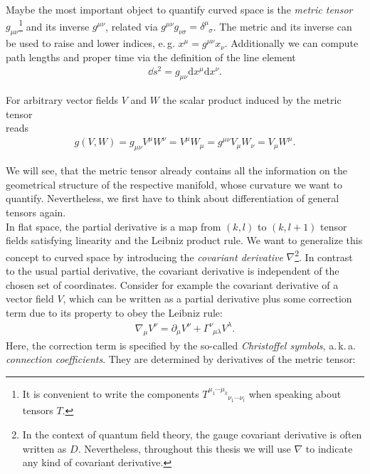 Maybe the most important object to quantify curved space is the \textit{metric tensor} $g_{\mu\nu}$\footnote{It is convenient to write the components $T_{\phantom{\mu_{1} \cdots \mu_{k}}\nu_{1} \cdots \nu_{l}}^{\mu_{1} \cdots \mu_{k}}$ when speaking about tensors $T$.} and its inverse  $g^{\mu\nu}$, related via $g^{\mu\nu}g_{\nu\sigma} = \delta^{\mu}_{\phantom{\mu}\sigma}$. The metric and its inverse can be used to raise and lower indices, e.\,g. $x^{\mu} = g^{\mu\nu}x_{\nu}$. Additionally we can compute path lengths and proper time via the definition of the line element 
\begin{align}
	\dd s^{2}=g_{\mu \nu} \mathrm{d} x^{\mu} \mathrm{d} x^{\nu}.
\end{align}
\begin{minipage}{\textwidth}
	For arbitrary vector fields $V$ and $W$ the scalar product induced by the metric tensor \\ reads
\vspace{-0.4cm}
\begin{align}
	g(V,W) = g_{\mu\nu}V^{\mu}W^{\nu} = V^{\mu}W_{\mu}= g^{\mu\nu}V_{\mu}W_{\nu} = V_{\mu}W^{\mu}.
\end{align}
\end{minipage}\vfill\newpage
We will see, that the metric tensor already contains all the information on the geometrical structure of the respective manifold, whose curvature we want to quantify. Nevertheless, we first have to think about differentiation of general tensors again. \\
In flat space, the partial derivative is a map from $(k, l)$ to $(k, l+1)$ tensor fields satisfying linearity and the Leibniz product rule. We want to generalize this concept to curved space by introducing the \textit{covariant derivative} $\nabla$\footnote{In the context of quantum field theory, the gauge covariant derivative is often written as $D$. Nevertheless, throughout this thesis we will use $\nabla$ to indicate any kind of covariant derivative.}. In contrast to the usual partial derivative, the covariant derivative is independent of the chosen set of coordinates. Consider for example the covariant derivative of a vector field $V$, which can be written as a partial derivative plus some correction term due to its property to obey the Leibniz rule:
\begin{align}
\nabla_{\mu} V^{\nu}=\partial_{\mu} V^{\nu}+\Gamma_{\phantom{\nu}\mu \lambda}^{\nu} V^{\lambda}.
\label{eqn:cov_deriv}
\end{align}
Here, the correction term is specified by the so-called \textit{Christoffel symbols}, a.\,k.\,a. \textit{connection coefficients}. They are determined by derivatives of the metric tensor:  
